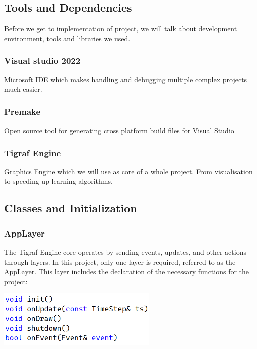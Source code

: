 \subsection{\LARGE Tools and Dependencies}

    Before we get to implementation of project, we will talk about development environment, tools and libraries we used.

    \subsubsection{\textbf{\large Visual studio 2022}}

        Microsoft IDE which makes handling and debugging multiple complex projects much easier.

    \subsubsection{\textbf{\large Premake}}

        Open source tool for generating cross platform build files for Visual Studio

    \subsubsection{\textbf{\large Tigraf Engine}}

        Graphics Engine which we will use as core of a whole project. From visualisation to speeding up learning algorithms.

\subsection{\LARGE Classes and Initialization}

    \subsubsection{\textbf{\large AppLayer}}

        The Tigraf Engine core operates by sending events, updates, and other actions through layers. In this project, only one layer is required, referred to as the AppLayer. This layer includes the declaration of the necessary functions for the project:

        \hfill
        
        \includegraphics[width=3in]{resources/Layer.png}

